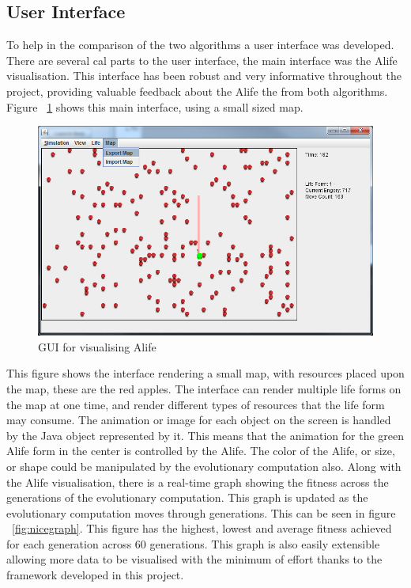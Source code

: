 \documentclass[12pt]{article}
\begin{document}
\subsection{User Interface}
To help in the comparison of the two algorithms a user interface was developed. There are several cal parts to the user interface, the main
interface was the Alife visualisation. This interface has been robust and very informative throughout the project, providing valuable
feedback about the Alife the from both algorithms. Figure ~\ref{fig:interface1} shows this main interface, using a small sized map.

\begin{figure} [ht]
\centering
\includegraphics[scale = 0.45]{smallvis.png}
\caption{GUI for visualising Alife}
\label{fig:interface1}
\end{figure}

This figure shows the interface rendering a small map, with resources placed upon the map, these are the red apples. The interface can
render multiple life forms on the map at one time, and render different types of resources that the life form may consume. The animation
or image for each object on the screen is handled by the Java object represented by it. This means that the animation for the green
Alife form in the center is controlled by the Alife. The color of the Alife, or size, or shape could be manipulated by the evolutionary
computation also. Along with the Alife visualisation, there is a real-time graph showing the fitness  across the generations of the 
evolutionary computation. This graph is updated as the evolutionary computation moves through generations. This can be seen in figure
~\ref{fig:nicegraph}. This figure has the highest, lowest and average fitness achieved for each generation across 60 generations. This
graph is also easily extensible allowing more data to be visualised with the minimum of effort thanks to the framework developed in
this project.
\end{document}
